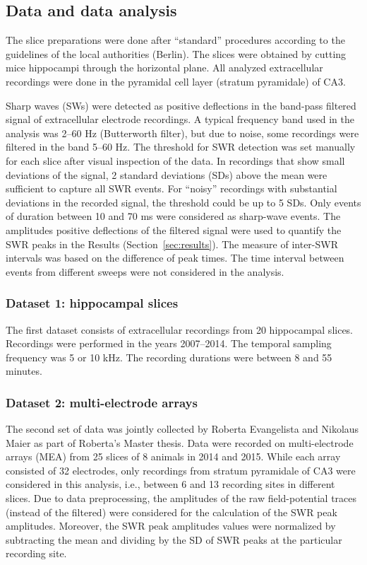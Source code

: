   \subsection{Data and data analysis}
    The slice preparations were done after ``standard'' procedures
    \citep{Maier2003, Maier2012} according to the guidelines of the local
    authorities (Berlin). The slices were obtained by cutting mice hippocampi
    through the horizontal plane. All analyzed extracellular recordings were
    done in the pyramidal cell layer (stratum pyramidale) of CA3.

    Sharp waves (SWs) were detected as positive deflections in the band-pass
    filtered signal of extracellular electrode recordings. A typical frequency
    band used in the analysis was 2--60 Hz (Butterworth filter), but due to
    noise, some recordings were filtered in the band 5--60 Hz. The threshold
    for SWR detection was set manually for each slice after visual inspection of
    the data. In recordings that show small deviations of the signal, 2
    standard deviations (SDs) above the mean were sufficient to capture all SWR
    events. For ``noisy'' recordings with substantial deviations in the recorded
    signal, the threshold could be up to 5 SDs. Only events of duration between
    10 and 70 ms were considered as sharp-wave events. The amplitudes positive
    deflections of the filtered signal were used to quantify the SWR peaks in
    the Results (Section~\ref{sec:results}). The measure of inter-SWR intervals
    was based on the difference of peak times. The time interval between events
    from different sweeps were not considered in the analysis.
 
    \subsubsection{Dataset 1: hippocampal slices}
      The first dataset consists of extracellular recordings from 20 hippocampal
      slices. Recordings were performed in the years 2007--2014. The temporal
      sampling frequency was 5 or 10 kHz. The recording durations were between 8
      and 55 minutes.

    \subsubsection{Dataset 2: multi-electrode arrays}
      The second set of data was jointly collected by Roberta Evangelista and Nikolaus
      Maier as part of Roberta's Master thesis. Data were recorded on
      multi-electrode arrays (MEA) from 25 slices of 8 animals in 2014 and
      2015. While each array consisted of 32 electrodes, only recordings from
      stratum pyramidale of CA3 were considered in this analysis, i.e., between
      6 and 13 recording sites in different slices. Due to data preprocessing,
      the amplitudes of the raw field-potential traces (instead of the
      filtered) were considered for the calculation of the SWR peak amplitudes.
      Moreover, the SWR peak amplitudes values were normalized by subtracting the
      mean and dividing by the SD of SWR peaks at the particular recording site.

